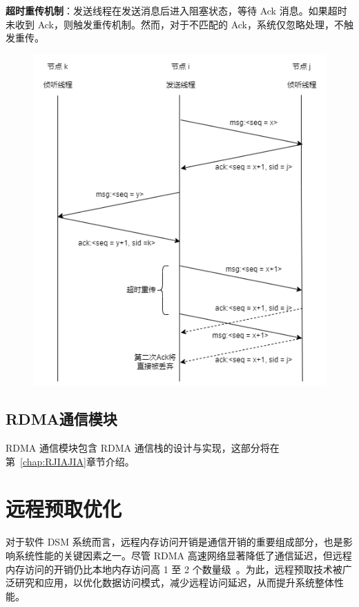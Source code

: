 {\begin{enumerate}[label=\arabic*.]
              \textbf{超时重传机制}：发送线程在发送消息后进入阻塞状态，等待 Ack 消息。如果超时未收到 Ack，则触发重传机制。然而，对于不匹配的 Ack，系统仅忽略处理，不触发重传。
              \begin{figure}[H]
                  \centering
                  \includegraphics[width=1\textwidth]{Img/M-JIAJIA-reliable-comm.png}
                  \label{fig:mjiajia-reliable-comm}
              \end{figure}

    \end{enumerate}

    \subsection{RDMA通信模块}
    RDMA 通信模块包含 RDMA 通信栈的设计与实现，这部分将在第~\ref{chap:RJIAJIA}章节介绍。

    \section{远程预取优化}
    对于软件 DSM 系统而言，远程内存访问开销是通信开销的重要组成部分，也是影响系统性能的关键因素之一。尽管 RDMA 高速网络显著降低了通信延迟，但远程内存访问的开销仍比本地内存访问高 1 至 2 个数量级~\citep{cai2018gam}。为此，远程预取技术被广泛研究和应用，以优化数据访问模式，减少远程访问延迟，从而提升系统整体性能。

}
